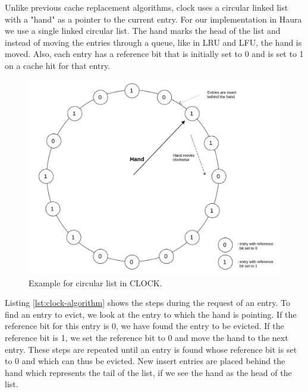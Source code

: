 \documentclass[
	12pt,
	a4paper,
	abstract,
	bibliography=totoc,
	chapterprefix,
	headings=openright,
	numbers=endperiod,
	parskip=half,
	twoside,
]{scrreprt}
\begin{document}
Unlike previous cache replacement algorithms, clock uses a circular linked list with a "hand" as a pointer to the current entry.
For our implementation in Haura we use a single linked circular list.
The hand marks the head of the list and instead of moving the entries through a queue, like in LRU and LFU, the hand is moved.
Also, each entry has a reference bit that is initially set to 0 and is set to 1 on a cache hit for that entry.

\begin{figure}[ht]
	\centering
	\includegraphics[scale=0.4]{clock.jpg}
	\caption{Example for circular list in CLOCK.}
		\label{fig:circular list for CLOCK}
\end{figure}


Listing \ref{lst:clock-algorithm} shows the steps during the request of an entry.
To find an entry to evict, we look at the entry to which the hand is pointing.
If the reference bit for this entry is 0, we have found the entry to be evicted.
If the reference bit is 1, we set the reference bit to 0 and move the hand to the next entry.
These steps are repeated until an entry is found whose reference bit is set to 0 and which can thus be evicted.
New insert entries are placed behind the hand which represents the tail of the list, if we see the hand as the head of the list.

\bigskip
\end{document}
